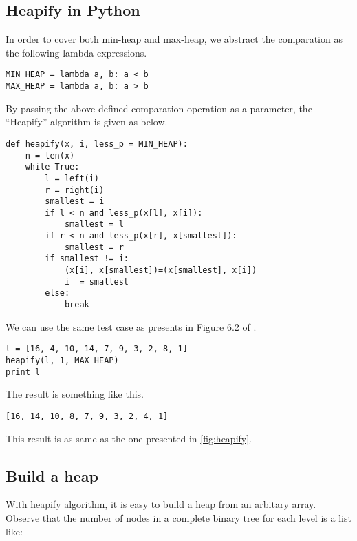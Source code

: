 \documentclass{article}
\begin{document}
\subsection*{Heapify in Python}

In order to cover both min-heap and max-heap, we abstract the comparation
as the following lambda expressions.

\lstset{language = Python}
\begin{lstlisting}
MIN_HEAP = lambda a, b: a < b
MAX_HEAP = lambda a, b: a > b 
\end{lstlisting}

By passing the above defined comparation operation as a parameter, the ``Heapify''
algorithm is given as below.

\begin{lstlisting}
def heapify(x, i, less_p = MIN_HEAP):
    n = len(x)
    while True:
        l = left(i)
        r = right(i)
        smallest = i
        if l < n and less_p(x[l], x[i]):
            smallest = l
        if r < n and less_p(x[r], x[smallest]):
            smallest = r
        if smallest != i:
            (x[i], x[smallest])=(x[smallest], x[i])
            i  = smallest
        else:
            break
\end{lstlisting}

We can use the same test case as presents in Figure 6.2 of \cite{CLRS}.

\begin{lstlisting}
l = [16, 4, 10, 14, 7, 9, 3, 2, 8, 1]
heapify(l, 1, MAX_HEAP)
print l 
\end{lstlisting}

The result is something like this.

\begin{verbatim}
[16, 14, 10, 8, 7, 9, 3, 2, 4, 1] 
\end{verbatim}

This result is as same as the one presented in \ref{fig:heapify}.

\subsection{Build a heap}

With heapify algorithm, it is easy to build a heap from an arbitary 
array. Observe that the number of nodes in a complete binary tree
for each level is a list like:
\end{document}
